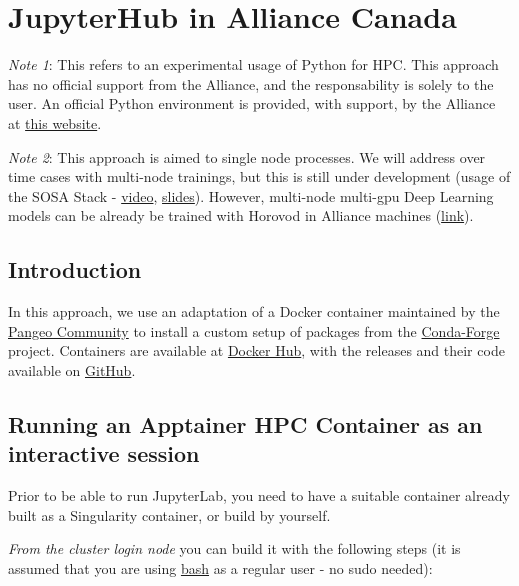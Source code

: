 \documentclass[
]{book}
\begin{document}
\hypertarget{jupyterhub-in-alliance-canada}{%
\chapter{JupyterHub in Alliance Canada}\label{jupyterhub-in-alliance-canada}}

\emph{Note 1}: This refers to an experimental usage of Python for HPC. This approach
has no official support from the Alliance, and the responsability is solely to
the user. An official Python environment is provided, with support, by the Alliance at
\href{https://docs.alliancecan.ca/wiki/Python}{this website}.

\emph{Note 2}: This approach is aimed to single node processes. We will address over time cases with multi-node trainings, but this is still under development (usage of the SOSA Stack - \href{https://youtu.be/2SbpEiOM5JE}{video}, \href{https://zenodo.org/record/7857369}{slides}). However, multi-node multi-gpu Deep Learning models can be already be trained with Horovod in Alliance machines (\href{https://docs.alliancecan.ca/wiki/TensorFlow/en\#Horovod}{link}).

\hypertarget{introduction-1}{%
\section{Introduction}\label{introduction-1}}

In this approach, we use an adaptation of a Docker container maintained by the \href{https://pangeo.io}{Pangeo Community} to install a custom setup of packages from the \href{https://conda-forge.org}{Conda-Forge} project. Containers are available at \href{https://hub.docker.com/repository/docker/ricardobarroslourenco/ts_rs/general}{Docker Hub}, with the releases and their code available on \href{https://github.com/ricardobarroslourenco/rs_images}{GitHub}.

\hypertarget{running-an-apptainer-hpc-container-as-an-interactive-session-1}{%
\section{Running an Apptainer HPC Container as an interactive session}\label{running-an-apptainer-hpc-container-as-an-interactive-session-1}}

Prior to be able to run JupyterLab, you need to have a suitable container already built
as a Singularity container, or build by yourself.

\emph{From the cluster login node} you can build it with the following steps (it is assumed that you are using \href{https://en.wikipedia.org/wiki/Bash_(Unix_shell)}{bash} as a regular user - no sudo needed):
\end{document}
